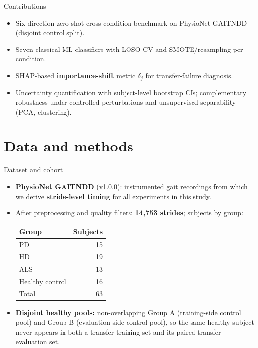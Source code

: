 \documentclass[aspectratio=43,10pt]{beamer}
\begin{document}
\begin{frame}{Contributions}
  \begin{itemize}
    \item Six-direction zero-shot cross-condition benchmark on PhysioNet GAITNDD (disjoint control split).
    \item Seven classical ML classifiers with LOSO-CV and SMOTE/resampling per condition.
    \item SHAP-based \textbf{importance-shift} metric $\delta_j$ for transfer-failure diagnosis.
    \item Uncertainty quantification with subject-level bootstrap CIs; complementary robustness under controlled perturbations and unsupervised separability (PCA, clustering).
  \end{itemize}
\end{frame}

\section{Data and methods}

\begin{frame}{Dataset and cohort}
  \begin{itemize}
    \item \textbf{PhysioNet GAITNDD} (v1.0.0): instrumented gait recordings from which we derive \textbf{stride-level timing} for all experiments in this study.
    \item After preprocessing and quality filters: \textbf{14{,}753 strides}; subjects by group:
      \begin{center}\footnotesize
        \begin{tabular}{@{}lr@{}}
          \toprule
          Group & Subjects \\
          \midrule
          PD & 15 \\
          HD & 19 \\
          ALS & 13 \\
          Healthy control & 16 \\
          \midrule
          Total & 63 \\
          \bottomrule
        \end{tabular}
      \end{center}
    \item \textbf{Disjoint healthy pools:} non-overlapping Group A (training-side control pool) and Group B (evaluation-side control pool), so the same healthy subject never appears in both a transfer-training set and its paired transfer-evaluation set.
  \end{itemize}
\end{frame}
\end{document}
